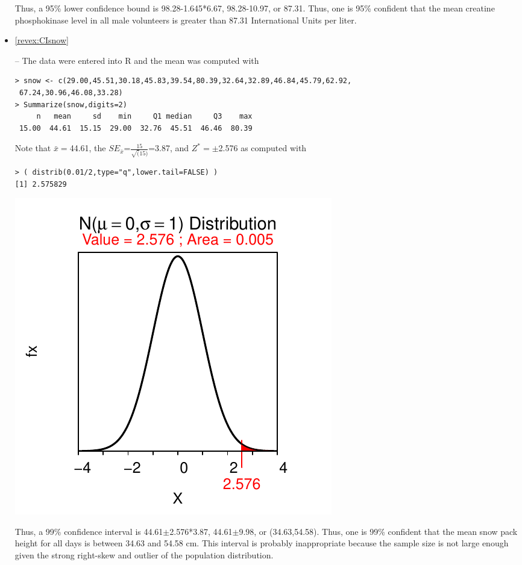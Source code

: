 \documentclass[10pt,openany]{book}\usepackage[]{graphicx}\usepackage[]{color}
\makeatletter
\newenvironment{kframe}{%
 \def\at@end@of@kframe{}%
 \ifinner\ifhmode%
  \def\at@end@of@kframe{\end{minipage}}%
  \begin{minipage}{\columnwidth}%
 \fi\fi%
 \def\FrameCommand##1{\hskip\@totalleftmargin \hskip-\fboxsep
 \colorbox{shadecolor}{##1}\hskip-\fboxsep
     \hskip-\linewidth \hskip-\@totalleftmargin \hskip\columnwidth}%
 \MakeFramed {\advance\hsize-\width
   \@totalleftmargin\z@ \linewidth\hsize
   \@setminipage}}%
 {\par\unskip\endMakeFramed%
 \at@end@of@kframe}
\newenvironment{knitrout}{}{} %
\makeatother
\begin{document}
\begin{itemize}
\begin{knitrout}
{}



\end{knitrout}
Thus, a 95\% lower confidence bound is 98.28-1.645*6.67, 98.28-10.97, or 87.31.  Thus, one is 95\% confident that the mean creatine phosphokinase level in all male volunteers is greater than 87.31 International Units per liter.
  \item \hypertarget{ans:CIsnow}{\ref{revex:CIsnow}} -- The data were entered into R and the mean was computed with
\begin{knitrout}
\color{fgcolor}\begin{kframe}
\begin{verbatim}
> snow <- c(29.00,45.51,30.18,45.83,39.54,80.39,32.64,32.89,46.84,45.79,62.92,
 67.24,30.96,46.08,33.28)
> Summarize(snow,digits=2)
     n   mean     sd    min     Q1 median     Q3    max 
 15.00  44.61  15.15  29.00  32.76  45.51  46.46  80.39 
\end{verbatim}
\end{kframe}
\end{knitrout}

Note that $\bar{x}=$44.61, the $SE_{\bar{x}}$=$\frac{15}{\sqrt(15)}$=3.87, and $Z^{*}=\pm$2.576 as computed with
\begin{knitrout}
\color{fgcolor}\begin{kframe}
\begin{verbatim}
> ( distrib(0.01/2,type="q",lower.tail=FALSE) )
[1] 2.575829
\end{verbatim}
\end{kframe}

{\centering \includegraphics[width=.4\linewidth]{Figs/unnamed-chunk-345-1} 

}



\end{knitrout}
Thus, a 99\% confidence interval is 44.61$\pm$2.576*3.87, 44.61$\pm$9.98, or (34.63,54.58).  Thus, one is 99\% confident that the mean snow pack height for all days is between 34.63 and 54.58 cm.  This interval is probably inappropriate because the sample size is not large enough given the strong right-skew and outlier of the population distribution.


\end{itemize}
\end{document}
